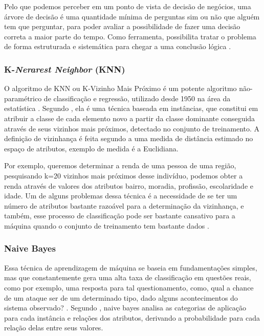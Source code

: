 \par
Pelo que podemos perceber em um ponto de vista de decisão de negócios, uma árvore de decisão é uma quantidade mínima de perguntas sim ou não que alguém tem que perguntar, para poder avaliar a possibilidade de fazer uma decisão correta a maior parte do tempo. Como ferramenta, possibilita tratar o problema de forma estruturada e sistemática para chegar a uma conclusão lógica \cite{Sara}. 


\subsubsection{K-\textit{Nerarest Neighbor} (KNN)}

\par
O algoritmo de KNN ou K-Vizinho Mais Próximo é um potente algoritmo não-paramétrico de classificação e regressão, utilizado desde 1950 na área da estatística \cite{Carvalho2014}. Segundo , ela é uma técnica baseada em instâncias, que constitui em atribuir a classe de cada elemento novo a partir da classe dominante conseguida através de seus vizinhos mais próximos, detectado no conjunto de treinamento. A definição de vizinhança é feita segundo a uma medida de distância estimado no espaço de atributos, exemplo de medida é a Euclidiana. 

\par
Por exemplo, queremos determinar a renda de uma pessoa de uma região, pesquisando k=20 vizinhos mais próximos desse indivíduo, podemos obter a renda através de valores dos atributos bairro, moradia, profissão, escolaridade e idade. Um de alguns problemas dessa técnica é a necessidade de se ter um número de atributos bastante razoável para a determinação da vizinhança, e também, esse processo de classificação pode ser bastante cansativo para a máquina quando o conjunto de treinamento tem bastante dados \cite{Cortes2002, Henke2011}.

\subsubsection{Naive Bayes}

\par
Essa técnica de aprendizagem de máquina se baseia em fundamentações simples, mas que constantemente gera uma alta taxa de classificação em questões reais, como por exemplo, uma resposta para tal questionamento, como, qual a chance de um ataque ser de um determinado tipo, dado alguns acontecimentos do sistema observado? \cite{Henke2011}. Segundo , naive bayes analisa as categorias de aplicação para cada instância e relações dos atributos, derivando a probabilidade para cada relação delas entre seus valores.

